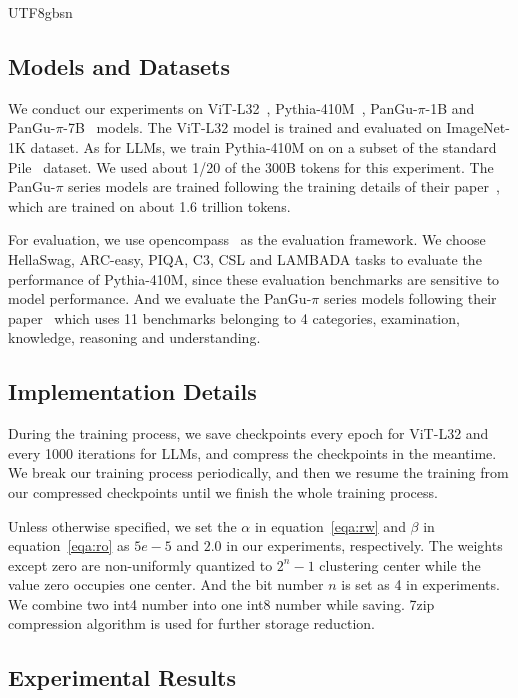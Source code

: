 \documentclass{article}
\theoremstyle{plain}
\theoremstyle{definition}
\theoremstyle{remark}
\begin{document}
\begin{CJK}{UTF8}{gbsn}
\subsection{Models and Datasets}
\label{ssec:eval-data}
We conduct our experiments on ViT-L32~\cite{dosovitskiy2020image}, Pythia-410M~\cite{biderman2023pythia}, PanGu-$\pi$-1B and PanGu-$\pi$-7B~\cite{wang2023pangu} models. The ViT-L32 model is trained and evaluated on ImageNet-1K dataset. As for LLMs, we train Pythia-410M on on a subset of the standard Pile~\cite{gao2020pile} dataset. We used about 1/20 of the 300B tokens for this experiment. The PanGu-$\pi$ series models are trained following the training details of their paper~\cite{wang2023pangu}, which are trained on about 1.6 trillion tokens.

For evaluation, we use opencompass~\cite{2023opencompass} as the evaluation framework. We choose HellaSwag, ARC-easy, PIQA, C3, CSL and LAMBADA tasks to evaluate the performance of Pythia-410M, since these evaluation benchmarks are sensitive to model performance. And we evaluate the PanGu-$\pi$ series models following their paper~\cite{wang2023pangu} which uses 11 benchmarks belonging to 4 categories, examination, knowledge, reasoning and understanding.

\subsection{Implementation Details}
\label{ssec:impl-detail}
During the training process, we save checkpoints every epoch for ViT-L32 and every 1000 iterations for LLMs, and compress the checkpoints in the meantime. We break our training process periodically, and then we resume the training from our compressed checkpoints until we finish the whole training process.

Unless otherwise specified, we set the $\alpha$ in equation~\ref{eqa:rw} and $\beta$ in equation~\ref{eqa:ro} as $5e-5$ and $2.0$ in our experiments, respectively. The weights except zero are non-uniformly quantized to $2^n-1$ clustering center while the value zero occupies one center. And the bit number $n$ is set as 4 in experiments. We combine two int4 number into one int8 number while saving. 7zip compression algorithm is used for further storage reduction.

\subsection{Experimental Results}
\label{ssec:exp-res}


\end{CJK}
\end{document}
